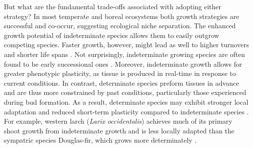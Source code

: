 \documentclass{article}
\begin{document}
	But what are the fundamental trade-offs associated with adopting either strategy? In most temperate and boreal ecosystems both growth strategies are successful and co-occur, suggesting ecological niche separation. The enhanced growth potential of indeterminate species allows them to easily outgrow competing species. Faster growth, however, might lead as well to higher turnovers and shorter life spans \citep{brienenForestCarbonSink2020b, milletRelationshipArchitectureSuccessional1999}. Not surprisingly, indeterminate growing species are often found to be early successional ones \citep{marksRelationExtensionGrowth1975, boojhGrowthStrategyTrees1982}.
	Moreover, indeterminate growth allows for greater phenotypic plasticity, as tissue is produced in real-time in response to current conditions. In contrast, determinate species preform tissues in advance and are thus more constrained by past conditions, particularly those experienced during bud formation. As a result, determinate species may exhibit stronger local adaptation and reduced short-term plasticity compared to indeterminate species  \citep{leitesForestTreeSpecies2023}. For example, western larch (\textit{Larix occidentalis}) achieves much of its primary shoot growth from indeterminate growth %
	and is less locally adapted than the sympatric species Douglas-fir, which grows more determinately \citep{roskillyWeakLocalAdaptation2024}.\\

\end{document}
